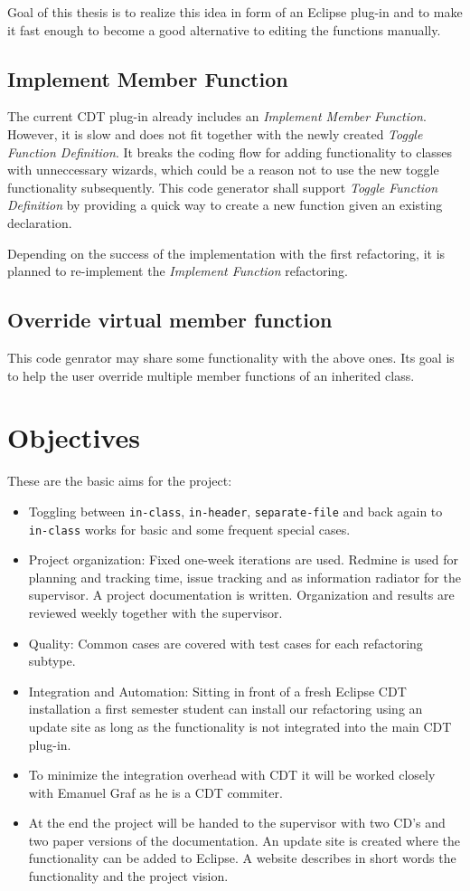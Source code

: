 Goal of this thesis is to realize this idea in form of an Eclipse plug-in and to 
make it fast enough to become a good alternative to editing the functions 
manually. 

\subsection{Implement Member Function}
The current CDT plug-in already includes an \textit{Implement Member Function}.
However, it is slow and does not fit together with the newly created 
\textit{Toggle Function Definition}. It breaks the coding flow for adding 
functionality to classes with unneccessary wizards, which could be a reason not 
to use the new toggle functionality subsequently. This code generator shall 
support \textit{Toggle Function Definition} by providing a quick way to create a 
new function given an existing declaration.

Depending on the success of the implementation with the first refactoring, it is 
planned to re-implement the \textit{Implement Function} refactoring.

\subsection{Override virtual member function}
This code genrator may share some functionality with the above ones. Its goal is 
to help the user override multiple member functions of an inherited class.

\section{Objectives}

These are the basic aims for the project:
\begin{itemize}
 \item Toggling between \texttt{in-class}, \texttt{in-header},
\texttt{separate-file} and back again to \texttt{in-class} works for basic and
some frequent special cases.
 \item Project organization: Fixed one-week iterations are used. Redmine is used
for planning and tracking time, issue tracking and as information radiator for
the supervisor. A project documentation is written. Organization and results are
reviewed weekly together with the supervisor.
 \item Quality: Common cases are covered with test cases for each
refactoring subtype.
 \item Integration and Automation: Sitting in front of a fresh Eclipse CDT
installation a first semester student can install our refactoring using an
update site as long as the functionality is not integrated into the main CDT
plug-in.
 \item To minimize the integration overhead with CDT it will be worked closely
with Emanuel Graf as he is a CDT commiter.
 \item At the end the project will be handed to the supervisor with two CD's and
two paper versions of the documentation. An update site is created where the
functionality can be added to Eclipse. A website describes in short words the
functionality and the project vision.
\end{itemize}

